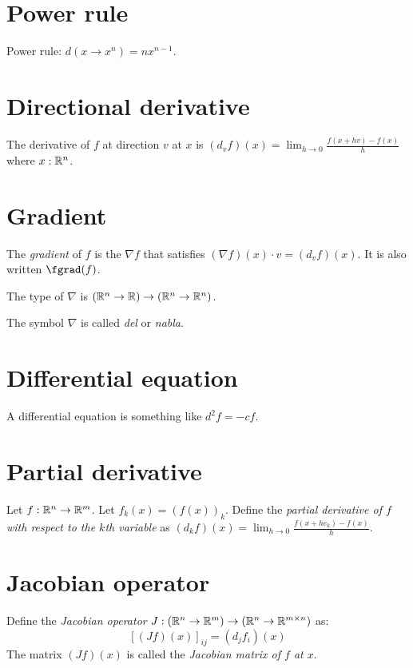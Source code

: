 \section{Power rule}

%
%
Power rule: \(d(x \to x^n) = n x^{n-1}\).

\section{Directional derivative}

%
%
The derivative of \(f\) at direction \(v\) at \(x\) is
\((d_v f)(x) = \lim_{h\to 0}\frac{f(x+h v)-f(x)}{h}\)
where \(x:\mathbb{R}^n\).

\section{Gradient}

%
The \emph{gradient} of \(f\) is the \(\nabla f\)
that satisfies \((\nabla f)(x) \cdot v = (d_v f)(x)\).
It is also written \(\fgrad(f)\).

The type of \(\nabla\) is \((\mathbb{R}^n \to \mathbb{R}) \to (\mathbb{R}^n \to \mathbb{R}^n)\).

The symbol \(\nabla\) is called \emph{del} or \emph{nabla}.

\section{Differential equation}

%
A differential equation is something like \(d^2f = -cf\).

\section{Partial derivative}

Let \(f : \mathbb{R}^n \to \mathbb{R}^m\).
Let \(f_k(x) = (f(x))_k\).
Define the
%
\emph{partial derivative of \(f\) with respect to the \(k\)th variable} as
\((d_k f)(x) = \lim_{h\to 0}\frac{f(x+he_k)-f(x)}{h}\).

\section{Jacobian operator}

Define the
%
\emph{Jacobian operator} \(J : (\mathbb{R}^n \to \mathbb{R}^m) \to (\mathbb{R}^n \to \mathbb{R}^{m \times n})\) as:
\[
    [(Jf)(x)]_{ij} = (d_j f_i)(x)
\]
The matrix \((Jf)(x)\) is called the
%
\emph{Jacobian matrix of \(f\) at \(x\)}.
